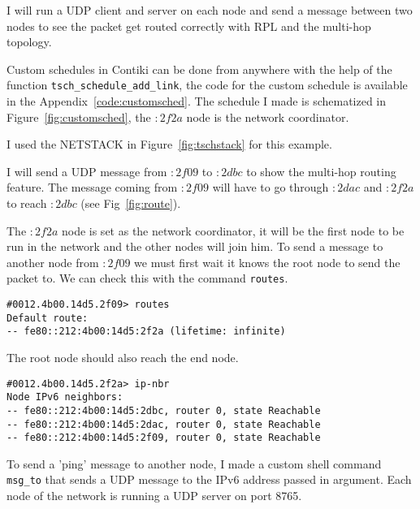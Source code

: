 I will run a UDP client and server on each node and
send a message between two nodes to see the packet get routed correctly with
RPL and the multi-hop topology.

Custom schedules in Contiki can be done from anywhere with the help of the
function \lstinline{tsch_schedule_add_link}, the code for the custom schedule
is available in the Appendix~\ref{code:customsched}.
The schedule I made is schematized in Figure~\ref{fig:customsched}, the $:2f2a$
node is the network coordinator.



I used the NETSTACK in Figure~\ref{fig:tschstack} for this example.



I will send a UDP message from $:2f09$ to $:2dbc$ to show the multi-hop routing
feature.
The message coming from $:2f09$ will have to go through $:2dac$ and $:2f2a$ to
reach $:2dbc$ (see Fig~\ref{fig:route}).




The $:2f2a$ node is set as the network coordinator, it will be the first node to be
run in the network and the other nodes will join him.
To send a message to another node from $:2f09$ we must first wait it
knows the root node to send the packet to.
We can check this with the command \lstinline{routes}.

\begin{lstlisting}[language=none]
#0012.4b00.14d5.2f09> routes
Default route:
-- fe80::212:4b00:14d5:2f2a (lifetime: infinite)
\end{lstlisting}

The root node should also reach the end node.

\begin{lstlisting}[language=none]
#0012.4b00.14d5.2f2a> ip-nbr
Node IPv6 neighbors:
-- fe80::212:4b00:14d5:2dbc, router 0, state Reachable
-- fe80::212:4b00:14d5:2dac, router 0, state Reachable
-- fe80::212:4b00:14d5:2f09, router 0, state Reachable
\end{lstlisting}

To send a 'ping' message to another node, I made a custom shell
command \lstinline{msg_to} that sends a UDP message to the IPv6 address
passed in argument.
Each node of the network is running a UDP server on port 8765.

